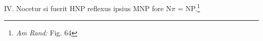  \pstart [p.~48] IV. Nocetur si fuerit HNP reflexus ipsius MNP fore N$\pi$ = NP.\footnote{\textit{Am Rand:} Fig. 64}
 \pend